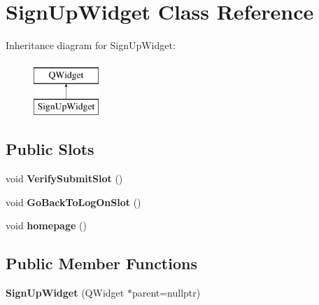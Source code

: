 \hypertarget{classSignUpWidget}{\section{Sign\-Up\-Widget Class Reference}
\label{classSignUpWidget}
}
Inheritance diagram for Sign\-Up\-Widget\-:\begin{figure}[H]
\begin{center}
\leavevmode
\includegraphics[height=2.000000cm]{classSignUpWidget}
\end{center}
\end{figure}
\subsection*{Public Slots}
\begin{DoxyCompactItemize}
\item 
\hypertarget{classSignUpWidget_abd2b2b0b1b915e3660aa06bf39ee35ab}{void {\bfseries Verify\-Submit\-Slot} ()}\label{classSignUpWidget_abd2b2b0b1b915e3660aa06bf39ee35ab}

\item 
\hypertarget{classSignUpWidget_aadadacbeaa56392604ba4433140568b3}{void {\bfseries Go\-Back\-To\-Log\-On\-Slot} ()}\label{classSignUpWidget_aadadacbeaa56392604ba4433140568b3}

\item 
\hypertarget{classSignUpWidget_a0d4727d741c170dd1f414195d92161a8}{void {\bfseries homepage} ()}\label{classSignUpWidget_a0d4727d741c170dd1f414195d92161a8}

\end{DoxyCompactItemize}
\subsection*{Public Member Functions}
\begin{DoxyCompactItemize}
\item 
\hypertarget{classSignUpWidget_aa6ee3a3bcdfe86cc64a340ffdcc64088}{{\bfseries Sign\-Up\-Widget} (Q\-Widget $\ast$parent=nullptr)}\label{classSignUpWidget_aa6ee3a3bcdfe86cc64a340ffdcc64088}

\end{DoxyCompactItemize}
